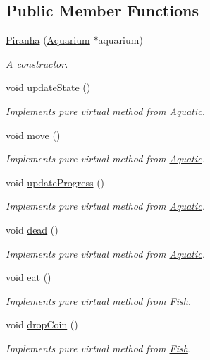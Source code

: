 \subsection*{Public Member Functions}
\begin{DoxyCompactItemize}
\item 
\mbox{\hyperlink{class_piranha_a5eb2894a518f67c377b2f51dae114099}{Piranha}} (\mbox{\hyperlink{class_aquarium}{Aquarium}} $\ast$aquarium)
\begin{DoxyCompactList}\small\item\em A constructor. \end{DoxyCompactList}\item 
void \mbox{\hyperlink{class_piranha_a851c302af9de1d6eaf727242e2912f62}{update\+State}} ()
\begin{DoxyCompactList}\small\item\em Implements pure virtual method from \mbox{\hyperlink{class_aquatic}{Aquatic}}. \end{DoxyCompactList}\item 
void \mbox{\hyperlink{class_piranha_a6b86e73b3e5a57ee0fdb768c24ab9b67}{move}} ()
\begin{DoxyCompactList}\small\item\em Implements pure virtual method from \mbox{\hyperlink{class_aquatic}{Aquatic}}. \end{DoxyCompactList}\item 
void \mbox{\hyperlink{class_piranha_ac4906080867655ef09591eba1cf2f00c}{update\+Progress}} ()
\begin{DoxyCompactList}\small\item\em Implements pure virtual method from \mbox{\hyperlink{class_aquatic}{Aquatic}}. \end{DoxyCompactList}\item 
void \mbox{\hyperlink{class_piranha_a1f30b46fb909558c44eba327e99d5f2e}{dead}} ()
\begin{DoxyCompactList}\small\item\em Implements pure virtual method from \mbox{\hyperlink{class_aquatic}{Aquatic}}. \end{DoxyCompactList}\item 
void \mbox{\hyperlink{class_piranha_ac48c0256edd56c427b3d82f6e0d4df82}{eat}} ()
\begin{DoxyCompactList}\small\item\em Implements pure virtual method from \mbox{\hyperlink{class_fish}{Fish}}. \end{DoxyCompactList}\item 
void \mbox{\hyperlink{class_piranha_aee107987f36631002f04c5283564382b}{drop\+Coin}} ()
\begin{DoxyCompactList}\small\item\em Implements pure virtual method from \mbox{\hyperlink{class_fish}{Fish}}. \end{DoxyCompactList}\end{DoxyCompactItemize}
